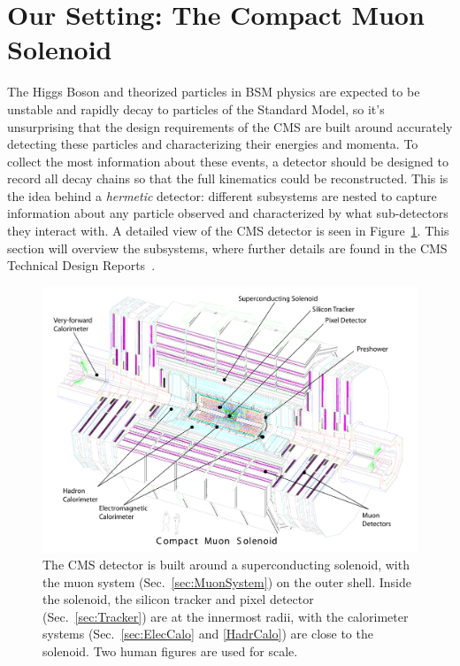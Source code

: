 \section{Our Setting: The Compact Muon Solenoid}
\label{sec:CMS}

The Higgs Boson and theorized particles in BSM physics are expected to be unstable and rapidly decay to particles of the Standard Model, so it's unsurprising that the design requirements of the CMS are built around accurately detecting these particles and characterizing their energies and momenta. To collect the most information about these events, a detector should be designed to record all decay chains so that the full kinematics could be reconstructed. This is the idea behind a \textit{hermetic} detector: different subsystems are nested to capture information about any particle observed and characterized by what sub-detectors they interact with. A detailed view of the CMS detector is seen in Figure~\ref{fig:ExplodedCMS}. This section will overview the subsystems, where further details are found in the CMS Technical Design Reports~\cite{CMSTDR:Vol1,CMSTDR:Vol2}.

\begin{figure}[htbp]
\begin{center}
\includegraphics[width=.9\linewidth]{Experiment/figures/ExplodedCMS.pdf}
\caption[The CMS Detector with Sub-Detector Systems]{The CMS detector is built around a superconducting solenoid, with the muon system (Sec.~\ref{sec:MuonSystem}) on the outer shell. Inside the solenoid, the silicon tracker and pixel detector (Sec.~\ref{sec:Tracker}) are at the innermost radii, with the calorimeter systems (Sec.~\ref{sec:ElecCalo} and \ref{HadrCalo}) are close to the solenoid. Two human figures are used for scale.}
\label{fig:ExplodedCMS}
\end{center}
\end{figure}

